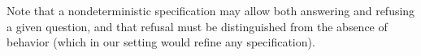 Note that a nondeterministic specification
may allow both answering and refusing a given question,
and that refusal must be distinguished from
the absence of behavior
(which in our setting would refine any specification).

%
%

